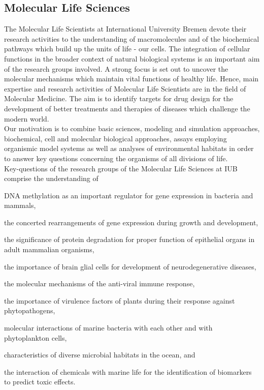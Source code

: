 \subsection{Molecular Life Sciences}
\label{MolLifeSc}

The Molecular Life Scientists at International University Bremen devote their research activities to the understanding of macromolecules and of the biochemical pathways which build up the units of life - our cells. The integration of cellular functions in the broader context of natural biological systems is an important aim of the research groups involved. A strong focus is set out to uncover the molecular mechanisms which maintain vital functions of healthy life. Hence, main expertise and research activities of Molecular Life Scientists are in the field of Molecular Medicine. The aim is to identify targets for drug design for the development of better treatments and therapies of diseases which challenge the modern world.\\

Our motivation is to combine basic sciences, modeling and simulation approaches, biochemical, cell and molecular biological approaches, assays employing organismic model systems as well as analyses of environmental habitats in order to answer key questions concerning the organisms of all divisions of life. \\

Key-questions of the research groups of the Molecular Life Sciences
at IUB comprise the understanding of
\begin{myitemize}
\item   DNA methylation as an important regulator for gene expression in bacteria and mammals,
\item   the concerted rearrangements of gene expression during growth and development,
\item   the significance of protein degradation for proper function of epithelial organs in adult mammalian organisms,
\item   the importance of brain glial cells for development of neurodegenerative diseases,
\item   the molecular mechanisms of the anti-viral immune response,
\item   the importance of virulence factors of plants during their response against  phytopathogens,
\item   molecular interactions of marine bacteria with each other and with phytoplankton cells,
\item   characteristics of diverse microbial habitats in the ocean, and
\item   the interaction of chemicals with marine life for the identification of biomarkers to predict toxic effects.\\
\end{myitemize}


